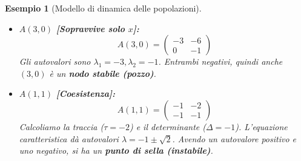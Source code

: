 \documentclass[openany]{book}
\newtheorem*{esempio}{Esempio}
\theoremstyle{definition}
\theoremstyle{remark}
\begin{document}
\begin{esempio}[Modello di dinamica delle popolazioni]
\vspace{0.3cm}
\begin{minipage}{0.65\textwidth}
\begin{itemize}
    \item \textbf{$A(3,0)$ [Sopravvive solo $x$]:}
    $$ A(3,0) = \begin{pmatrix} -3 & -6 \\ 0 & -1 \end{pmatrix} $$
    Gli autovalori sono $\lambda_1 = -3, \lambda_2 = -1$. Entrambi negativi, quindi anche $(3,0)$ è un \textbf{nodo stabile (pozzo)}.
\end{itemize}
\end{minipage}
\begin{minipage}{0.3\textwidth}
\begin{center}
\end{center}
\end{minipage}

\vspace{0.3cm}
\begin{minipage}{0.65\textwidth}
\begin{itemize}
    \item \textbf{$A(1,1)$ [Coesistenza]:}
    $$ A(1,1) = \begin{pmatrix} -1 & -2 \\ -1 & -1 \end{pmatrix} $$
    Calcoliamo la traccia ($\tau = -2$) e il determinante ($\Delta = -1$). L'equazione caratteristica dà autovalori $\lambda = -1 \pm \sqrt{2}$. Avendo un autovalore positivo e uno negativo, si ha un \textbf{punto di sella (instabile)}.
\end{itemize}
\end{minipage}
\begin{minipage}{0.3\textwidth}
\begin{center}
\end{center}
\end{minipage}
\end{esempio}
\end{document}
